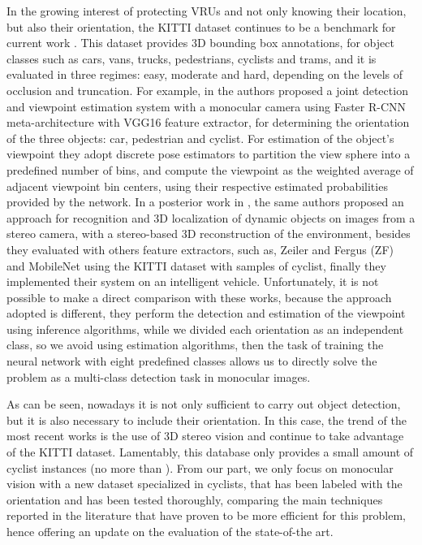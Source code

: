 \documentclass[journal]{IEEEtran}
\begin{document}
In the growing interest of protecting VRUs and not only knowing their location, but also their orientation, the KITTI dataset continues to be a benchmark for current work \cite{chen20153d,guindel2017modeling,guindel2019traffic}. This dataset provides 3D bounding box annotations, for object classes such as cars, vans, trucks, pedestrians, cyclists and trams, and it is evaluated in three regimes: easy, moderate and hard, depending on the levels of occlusion and truncation. For example, in \cite{guindel2018fast} the authors proposed a joint detection and viewpoint estimation system with a monocular camera using Faster R-CNN meta-architecture with VGG16 feature extractor, for determining the orientation of the three objects: car, pedestrian and cyclist. For estimation of the object's viewpoint they adopt discrete pose estimators to partition the view sphere into a predefined number of bins, and compute the viewpoint as the weighted average of adjacent viewpoint bin centers, using their respective estimated probabilities provided by the network. In a posterior work in \cite{guindel2019traffic}, the same authors proposed an approach for recognition and 3D localization of dynamic objects on images from a stereo camera, with a stereo-based 3D reconstruction of the environment, besides they evaluated with others feature extractors, such as, Zeiler and Fergus (ZF) and MobileNet using the KITTI dataset with  samples of cyclist, finally they implemented their system on an intelligent vehicle. Unfortunately, it is not possible to make a direct comparison with these works, because the approach adopted is different, they perform the detection and estimation of the viewpoint using inference algorithms, while we divided each orientation as an independent class, so we avoid using estimation algorithms, then the task of training the neural network with eight predefined classes allows us to directly solve the problem as a multi-class detection task in monocular images.

As can be seen, nowadays it is not only sufficient to carry out object detection, but it is also necessary to include their orientation. In this case, the trend of the most recent works is the use of 3D stereo vision and continue to take advantage of the KITTI dataset. Lamentably, this database only provides a small amount of cyclist instances (no more than  \cite{BenchmarkCylistDetect2016,guindel2019traffic}). From our part, we only focus on monocular vision with a new dataset specialized in cyclists, that has been labeled with the orientation and has been tested thoroughly, comparing the main techniques reported in the literature that have proven to be more efficient for this problem, hence offering an update on the evaluation of the state-of-the art.
\end{document}
